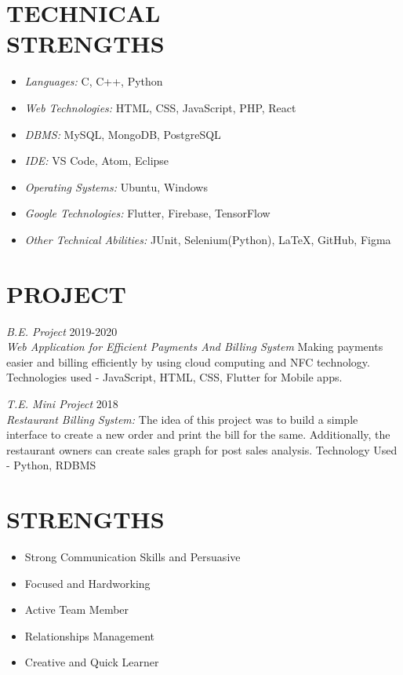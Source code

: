 \documentclass[margin, 12pt]{res} %
\begin{document}
\begin{resume}
\section{TECHNICAL \\ STRENGTHS} 

\begin{itemize}
\item {\sl Languages:} C, C++, Python
\item {\sl Web Technologies:} HTML, CSS, JavaScript, PHP, React
\item {\sl DBMS:} MySQL, MongoDB, PostgreSQL
\item {\sl IDE:} VS Code, Atom, Eclipse
\item {\sl Operating Systems:} Ubuntu, Windows
\item {\sl Google Technologies:} Flutter, Firebase, TensorFlow
\item {\sl Other Technical Abilities:} JUnit, Selenium(Python), LaTeX, GitHub, Figma
\end{itemize}

 
\section{PROJECT}
{\sl B.E. Project} \hfill 2019-2020 \\
{\sl Web Application for Efficient Payments And Billing System }
Making payments easier and billing efficiently by using cloud computing and NFC technology. Technologies used - JavaScript, HTML, CSS, Flutter for Mobile apps.

{\sl T.E. Mini Project} \hfill 2018 \\
{\sl Restaurant Billing System:}
The idea of this project was to build a simple interface to create a new order and print the bill for the same. Additionally, the restaurant owners can create sales graph for post sales analysis. Technology Used - Python, RDBMS


\section{STRENGTHS}
\begin{itemize}
\item Strong Communication Skills and Persuasive
\item Focused and Hardworking
\item Active Team Member
\item Relationships Management
\item Creative and Quick Learner
\end{itemize}


\end{resume}
\end{document}
